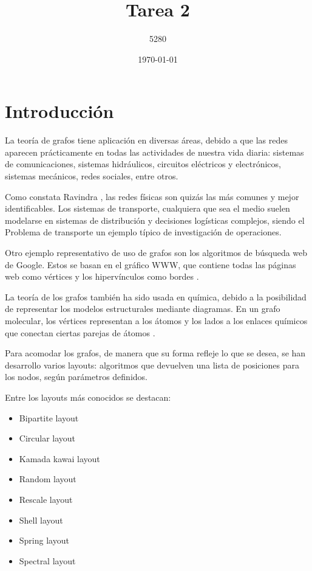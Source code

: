 \documentclass{article}
\title{
Tarea 2
}
\author{5280}
\date{\today}
\begin{document}
\maketitle


\section*{Introducción}

La teoría de grafos tiene aplicación en diversas áreas, debido a que las redes aparecen prácticamente en todas las actividades de nuestra vida diaria: sistemas de comunicaciones, sistemas hidráulicos, circuitos eléctricos y electrónicos, sistemas mecánicos, redes sociales, entre otros. 

Como constata Ravindra \cite{ahuja2017network}, las redes físicas son quizás las más comunes y mejor identificables. Los sistemas de transporte, cualquiera que sea el medio suelen modelarse en sistemas de distribución  y decisiones logísticas complejos, siendo el Problema de transporte un ejemplo típico de investigación de operaciones. 

Otro ejemplo representativo de uso de grafos son los algoritmos de búsqueda web de Google. Estos se basan en el gráfico WWW, que contiene todas las páginas web como vértices y los  hipervínculos como bordes \cite{chung2010graph}.

La teoría de los grafos también ha sido usada en química, debido a la posibilidad de representar los modelos estructurales mediante diagramas. En un grafo molecular, los vértices representan a los átomos y los lados a los enlaces químicos que conectan ciertas parejas de átomos \cite{amador}.

Para acomodar los grafos, de manera que su forma refleje lo que se desea, se han desarrollo varios layouts: algoritmos que devuelven una lista de posiciones para los nodos, según  parámetros definidos.

Entre los layouts más conocidos se destacan:
\begin{itemize}

\item Bipartite layout
\item Circular layout
\item Kamada kawai layout
\item Random layout
\item Rescale layout
\item Shell layout
\item Spring layout
\item Spectral layout
\end{itemize}
\end{document}
